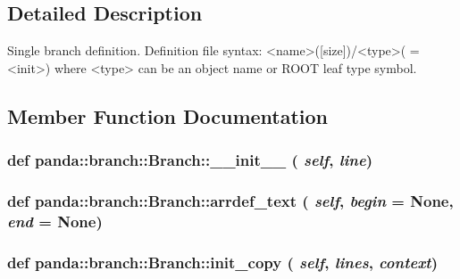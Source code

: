 \subsection{Detailed Description}
\begin{DoxyVerb}
Single branch definition. Definition file syntax:
<name>([size])/<type>( = <init>)
where <type> can be an object name or ROOT leaf type symbol.
\end{DoxyVerb}
 

\subsection{Member Function Documentation}
\hypertarget{classpanda_1_1branch_1_1Branch_a5b3cb923ee20a15362151dd2bf29ae62}{
\subsubsection[{\_\-\_\-init\_\-\_\-}]{\setlength{\rightskip}{0pt plus 5cm}def panda::branch::Branch::\_\-\_\-init\_\-\_\- ( {\em self}, \/   {\em line})}}
\label{classpanda_1_1branch_1_1Branch_a5b3cb923ee20a15362151dd2bf29ae62}
\hypertarget{classpanda_1_1branch_1_1Branch_a001d0a6757fd6fd54743f5d361850b93}{
\subsubsection[{arrdef\_\-text}]{\setlength{\rightskip}{0pt plus 5cm}def panda::branch::Branch::arrdef\_\-text ( {\em self}, \/   {\em begin} = {\ttfamily None}, \/   {\em end} = {\ttfamily None})}}
\label{classpanda_1_1branch_1_1Branch_a001d0a6757fd6fd54743f5d361850b93}
\hypertarget{classpanda_1_1branch_1_1Branch_ad9e2f082c14fcc478088c3be379ce475}{
\subsubsection[{init\_\-copy}]{\setlength{\rightskip}{0pt plus 5cm}def panda::branch::Branch::init\_\-copy ( {\em self}, \/   {\em lines}, \/   {\em context})}}
